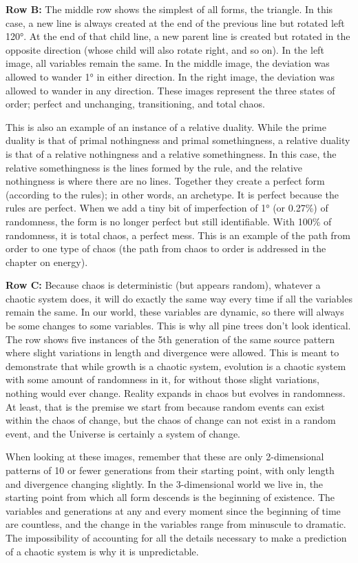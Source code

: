 \documentclass[
]{article}
\begin{document}
\textbf{Row B:} The middle row shows the simplest of all forms, the
triangle. In this case, a new line is always created at the end of the
previous line but rotated left 120°. At the end of that child line, a
new parent line is created but rotated in the opposite direction (whose
child will also rotate right, and so on). In the left image, all
variables remain the same. In the middle image, the deviation was
allowed to wander 1° in either direction. In the right image, the
deviation was allowed to wander in any direction. These images represent
the three states of order; perfect and unchanging, transitioning, and
total chaos.

This is also an example of an instance of a relative duality. While the
prime duality is that of primal nothingness and primal somethingness, a
relative duality is that of a relative nothingness and a relative
somethingness. In this case, the relative somethingness is the lines
formed by the rule, and the relative nothingness is where there are no
lines. Together they create a perfect form (according to the rules); in
other words, an archetype. It is perfect because the rules are perfect.
When we add a tiny bit of imperfection of 1° (or 0.27\%) of randomness,
the form is no longer perfect but still identifiable. With 100\% of
randomness, it is total chaos, a perfect mess. This is an example of the
path from order to one type of chaos (the path from chaos to order is
addressed in the chapter on energy).

\textbf{Row C:} Because chaos is deterministic (but appears random),
whatever a chaotic system does, it will do exactly the same way every
time if all the variables remain the same. In our world, these variables
are dynamic, so there will always be some changes to some variables.
This is why all pine trees don't look identical. The row shows five
instances of the 5th generation of the same source pattern where slight
variations in length and divergence were allowed. This is meant to
demonstrate that while growth is a chaotic system, evolution is a
chaotic system with some amount of randomness in it, for without those
slight variations, nothing would ever change. Reality expands in chaos
but evolves in randomness. At least, that is the premise we start from
because random events can exist within the chaos of change, but the
chaos of change can not exist in a random event, and the Universe is
certainly a system of change.

When looking at these images, remember that these are only 2-dimensional
patterns of 10 or fewer generations from their starting point, with only
length and divergence changing slightly. In the 3-dimensional world we
live in, the starting point from which all form descends is the
beginning of existence. The variables and generations at any and every
moment since the beginning of time are countless, and the change in the
variables range from minuscule to dramatic. The impossibility of
accounting for all the details necessary to make a prediction of a
chaotic system is why it is unpredictable.
\end{document}
